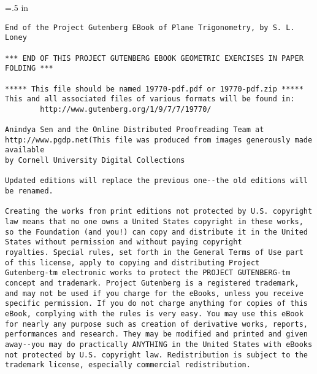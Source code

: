 \documentclass{book}[2021/07/26]
\begin{document}
\begin{mainmatter}
\headsep =.5 in
\begin{spacing}{1.3}




















\newpage
\pagestyle{empty}

\small
{}
\begin{verbatim}
End of the Project Gutenberg EBook of Plane Trigonometry, by S. L. Loney

*** END OF THIS PROJECT GUTENBERG EBOOK GEOMETRIC EXERCISES IN PAPER FOLDING ***

***** This file should be named 19770-pdf.pdf or 19770-pdf.zip *****
This and all associated files of various formats will be found in:
        http://www.gutenberg.org/1/9/7/7/19770/

Anindya Sen and the Online Distributed Proofreading Team at
http://www.pgdp.net(This file was produced from images generously made available
by Cornell University Digital Collections

Updated editions will replace the previous one--the old editions will
be renamed.

Creating the works from print editions not protected by U.S. copyright
law means that no one owns a United States copyright in these works,
so the Foundation (and you!) can copy and distribute it in the United
States without permission and without paying copyright
royalties. Special rules, set forth in the General Terms of Use part
of this license, apply to copying and distributing Project
Gutenberg-tm electronic works to protect the PROJECT GUTENBERG-tm
concept and trademark. Project Gutenberg is a registered trademark,
and may not be used if you charge for the eBooks, unless you receive
specific permission. If you do not charge anything for copies of this
eBook, complying with the rules is very easy. You may use this eBook
for nearly any purpose such as creation of derivative works, reports,
performances and research. They may be modified and printed and given
away--you may do practically ANYTHING in the United States with eBooks
not protected by U.S. copyright law. Redistribution is subject to the
trademark license, especially commercial redistribution.


\end{verbatim}
\end{spacing}
\end{mainmatter}
\end{document}
